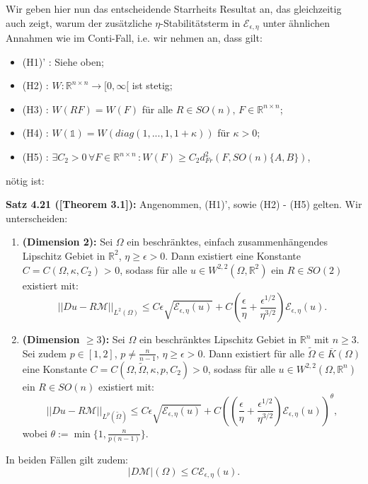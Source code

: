 Wir geben hier nun das entscheidende Starrheits Resultat an, das gleichzeitig auch zeigt, warum der zusätzliche \(\eta\)-Stabilitätsterm in \(\mathcal{E}_{\epsilon, \eta}\) unter ähnlichen Annahmen wie im Conti-Fall, i.e. wir nehmen an, dass gilt:
\begin{itemize}
    \item (H1)' : Siehe oben;
    \item (H2) : \(W : \mathbb{R}^{n \times n} \to [0,\infty[\) ist stetig;
    \item (H3) : \(W(RF) = W(F)\) für alle \(R \in SO(n), \, F \in \mathbb{R}^{n \times n}\);
    \item (H4) : \(W(\mathbb{1}) = W(diag(1,...,1,1 + \kappa))\) für \(\kappa > 0\);
    \item (H5) : \(\exists C_2 > 0 \, \forall F \in \mathbb{R}^{n \times n} \, : W(F) \geq C_2 d_{Fr}^2(F,SO(n)\{A,B\})\),
\end{itemize}
nötig ist:\\[0.5cm]
\colorbox{generalYellow}{\begin{minipage}{16cm}{\textcolor{black}{}{\label{theo4.21}}}
\textbf{Satz 4.21 (\cite{davoli2020two}[Theorem 3.1]):} Angenommen, (H1)', sowie (H2) - (H5) gelten. Wir unterscheiden:
\begin{enumerate}
    \item \textbf{(Dimension 2):} Sei \(\Omega\) ein beschränktes, einfach zusammenhängendes Lipschitz Gebiet in \(\mathbb{R}^2\), \(\eta \geq \epsilon > 0\). Dann existiert eine Konstante \(C = C(\Omega,\kappa,C_2)\) > 0, sodass für alle \(u \in W^{2,2}(\Omega,\mathbb{R}^2)\) ein \(R \in SO(2)\) existiert mit:
    \begin{equation}
        ||Du - R \mathcal{M}||_{L^2(\Omega)} \leq C \epsilon \sqrt{\mathcal{E}_{\epsilon,\eta}(u)} + C (\frac{\epsilon}{\eta} + \frac{\epsilon^{1/2}}{\eta^{3/2}}) \mathcal{E}_{\epsilon,\eta}(u).
    \end{equation}
    \item \textbf{(Dimension \(\geq 3\)):} Sei \(\Omega\) ein beschränktes Lipschitz Gebiet in \(\mathbb{R}^n\) mit \(n \geq 3\). Sei zudem \(p \in [1,2]\), \(p \neq \frac{n}{n-1}\), \(\eta \geq \epsilon > 0\). Dann existiert für alle \(\tilde{\Omega} \in \overline{K}(\Omega)\) eine Konstante \(C = C(\Omega, \tilde{\Omega}, \kappa, p, C_2) > 0\), sodass für alle \(u \in W^{2,2}(\Omega,\mathbb{R}^n)\) ein \(R \in SO(n)\) existiert mit:
    \begin{equation}
        ||Du - R \mathcal{M}||_{L^p(\tilde{\Omega})} \leq C \epsilon \sqrt{\mathcal{E}_{\epsilon,\eta}(u)} + C ((\frac{\epsilon}{\eta} + \frac{\epsilon^{1/2}}{\eta^{3/2}}) \mathcal{E}_{\epsilon,\eta}(u))^{\theta},
    \end{equation}
    wobei \(\theta := \min \{1,\frac{n}{p(n-1)}\}\).
\end{enumerate}
In beiden Fällen gilt zudem:
\begin{equation}
    |D\mathcal{M}|(\Omega) \leq C \mathcal{E}_{\epsilon,\eta}(u).
\end{equation}
\end{minipage}}

